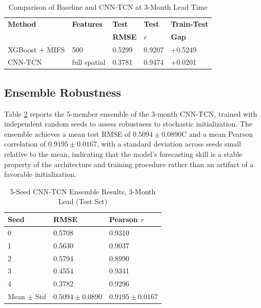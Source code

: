 \documentclass[conference]{IEEEtran}
\begin{document}
\begin{table}[t]
\centering
\caption{Comparison of Baseline and CNN-TCN at 3-Month Lead Time}
\label{tab:comparison}
\begin{tabular}{@{}lllll@{}}
\toprule
\textbf{Method} & \textbf{Features} & \textbf{Test} & \textbf{Test} & \textbf{Train-Test} \\
 & & \textbf{RMSE} & \textbf{$r$} & \textbf{Gap} \\
\midrule
XGBoost + MIFS & 500 & 0.5299 & 0.9207 & +0.5249 \\
CNN-TCN & full spatial & 0.3781 & 0.9474 & +0.0201 \\
\bottomrule
\end{tabular}
\end{table}

\subsection{Ensemble Robustness}
Table \ref{tab:ensemble} reports the 5-member ensemble of the 3-month CNN-TCN, trained with independent random seeds to assess robustness to stochastic initialization. The ensemble achieves a mean test RMSE of $0.5094\pm0.0890$\textdegree C and a mean Pearson correlation of $0.9195\pm0.0167$, with a standard deviation across seeds small relative to the mean, indicating that the model's forecasting skill is a stable property of the architecture and training procedure rather than an artifact of a favorable initialization.

\begin{table}[t]
\centering
\caption{5-Seed CNN-TCN Ensemble Results, 3-Month Lead (Test Set)}
\label{tab:ensemble}
\begin{tabular}{@{}lll@{}}
\toprule
\textbf{Seed} & \textbf{RMSE} & \textbf{Pearson $r$} \\
\midrule
0 & 0.5708 & 0.9310 \\
1 & 0.5630 & 0.9037 \\
2 & 0.5794 & 0.8990 \\
3 & 0.4554 & 0.9341 \\
4 & 0.3782 & 0.9296 \\
\midrule
Mean $\pm$ Std & $0.5094\pm0.0890$ & $0.9195\pm0.0167$ \\
\bottomrule
\end{tabular}
\end{table}
\end{document}
